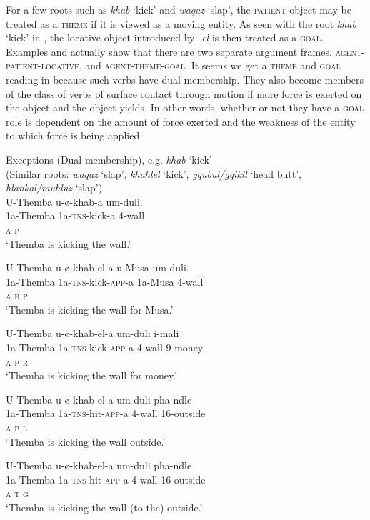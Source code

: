 \documentclass[output=paper]{langsci/langscibook}
\begin{document}
For a few roots such as \textit{khab} ‘kick’ and \textit{waqaz} ‘slap’, the \textsc{patient} object may be treated as a \textsc{theme} if it is viewed as a moving entity. As seen with the root \textit{khab} ‘kick’ in , the locative object introduced by \textit{-el} is then treated as a \textsc{goal}. Examples  and  actually show that there are two separate argument framesː \textsc{agent-patient-locative}, and \textsc{agent-theme-goal}. It seems we get a \textsc{theme} and \textsc{goal} reading in  because such verbs have dual membership. They also become members of the class of verbs of surface contact through motion if more force is exerted on the object and the object yields. In other words, whether or not they have a \textsc{goal} role is dependent on the amount of force exerted and the weakness of the entity to which force is being applied.

\ea
{Exceptions (Dual membership), e.g. \textit{khab }‘kick’}\\
 (Similar roots: \textit{waqaz} ‘slap’, \textit{khahlel} ‘kick’, \textit{gqubul/gqikil} ‘head butt’, \textit{hlankal/muhluz} ‘slap’)\\
\ea
\gll U-Themba u-ø-khab-a um-duli. \\
 1a-Themba 1a-\textsc{tns}-kick-a 4-wall\\
 \textsc{a p}\\
\glt ‘Themba is kicking the wall.’

\ex
\gll U-Themba u-ø-khab-el-a u-Musa um-duli. \\
 1a-Themba 1a-\textsc{tns}-kick-\textsc{app}-a 1a-Musa 4-wall\\
 \textsc{a b p}\\
\glt ‘Themba is kicking the wall for Musa.’

\ex
\gll U-Themba u-ø-khab-el-a um-duli i-mali\\
 1a-Themba 1a-\textsc{tns}-kick-\textsc{app}-a 4-wall 9-money\\
 \textsc{a p r}\\
\glt ‘Themba is kicking the wall for money.’

\ex
\gll U-Themba u-ø-khab-el-a um-duli pha-ndle \\
 1a-Themba 1a-\textsc{tns}-hit-\textsc{app}-a 4-wall 16-outside\\
 \textsc{a p l}\\
\glt ‘Themba is kicking the wall outside.’

\ex
\gll U-Themba u-ø-khab-el-a um-duli pha-ndle \\
 1a-Themba 1a-\textsc{tns}-hit-\textsc{app}-a 4-wall 16-outside\\
 \textsc{a t g}\\
\glt ‘Themba is kicking the wall (to the) outside.’
\z
\z
\end{document}
